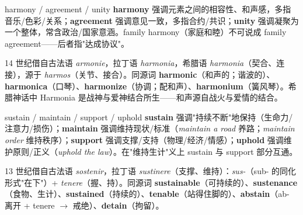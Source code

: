 \documentclass[../main.tex]{subfiles}
\begin{document}
\begin{lex}{harmony / agreement / unity}
\textbf{harmony} 强调元素之间的相容性、和声感，多指音乐/色彩/关系；\textbf{agreement} 强调意见一致，多指合约/共识；\textbf{unity} 强调凝聚为一个整体，常含政治/国家意涵。family harmony（家庭和睦）不可说成 family agreement——后者指"达成协议"。
\end{lex}

\begin{origin}
14 世纪借自古法语 \textit{armonie}，拉丁语 \textit{harmonia}，希腊语 \textit{harmonia}（契合、连接），源于 \textit{harmos}（关节、接合）。同源词 \textbf{harmonic}（和声的；谐波的）、\textbf{harmonica}（口琴）、\textbf{harmonize}（协调；配和声）、\textbf{harmonium}（簧风琴）。希腊神话中 Harmonia 是战神与爱神结合所生——和声源自战火与爱情的结合。
\end{origin}





\begin{gram}{sustain / maintain / support / uphold}
\textbf{sustain} 强调"持续不断"地保持（生命力/注意力/损伤）；\textbf{maintain} 强调维持现状/标准（\textit{maintain a road} 养路；\textit{maintain order} 维持秩序）；\textbf{support} 强调支撑/支持（物理/经济/情感）；\textbf{uphold} 强调维护原则/正义（\textit{uphold the law}）。在"维持生计"义上 sustain 与 support 部分互通。
\end{gram}

\begin{origin}
13 世纪借自古法语 \textit{sostenir}，拉丁语 \textit{sustinere}（支撑、维持）：\textit{sus-}（sub- 的同化形式"在下"）+ \textit{tenere}（握、持）。同源词 \textbf{sustainable}（可持续的）、\textbf{sustenance}（食物、生计）、\textbf{sustained}（持续的）、\textbf{tenable}（站得住脚的）、\textbf{abstain}（ab- 离开 + tenere $\to$ 戒绝）、\textbf{detain}（拘留）。
\end{origin}
\end{document}
